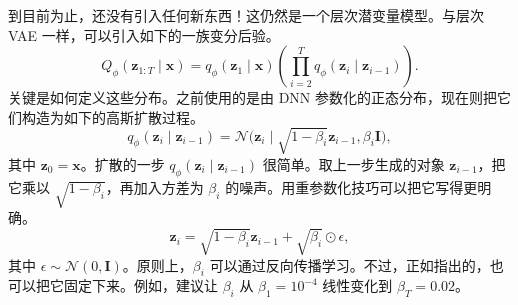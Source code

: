 到目前为止，还没有引入任何新东西！这仍然是一个层次潜变量模型。与层次 VAE 一样，可以引入如下的一族变分后验。
\begin{equation}
Q_\phi(\mathbf{z}_{1:T}\mid\mathbf{x})=q_\phi(\mathbf{z}_1\mid\mathbf{x})
 \left(\prod_{i=2}^T q_\phi(\mathbf{z}_i\mid\mathbf{z}_{i-1})\right).
\tag{5.88}\label{eq:05-88}
\end{equation}
关键是如何定义这些分布。之前使用的是由 DNN 参数化的正态分布，现在则把它们构造为如下的高斯扩散过程。
\begin{equation}
q_\phi(\mathbf{z}_i\mid\mathbf{z}_{i-1})
 =\mathcal{N}\bigl(\mathbf{z}_i\mid\sqrt{1-\beta_i}\mathbf{z}_{i-1},\beta_i\mathbf{I}\bigr),
\tag{5.89}\label{eq:05-89}
\end{equation}
其中 $\mathbf{z}_0=\mathbf{x}$。扩散的一步 $q_\phi(\mathbf{z}_i\mid\mathbf{z}_{i-1})$ 很简单。取上一步生成的对象 $\mathbf{z}_{i-1}$，把它乘以 $\sqrt{1-\beta_i}$，再加入方差为 $\beta_i$ 的噪声。用重参数化技巧可以把它写得更明确。
\begin{equation}
\mathbf{z}_i=\sqrt{1-\beta_i}\mathbf{z}_{i-1}+\sqrt{\beta_i}\odot\epsilon,
\tag{5.90}\label{eq:05-90}
\end{equation}
其中 $\epsilon\sim\mathcal{N}(0,\mathbf{I})$。原则上，$\beta_i$ 可以通过反向传播学习。不过，正如指出的，也可以把它固定下来。例如，建议让 $\beta_i$ 从 $\beta_1=10^{-4}$ 线性变化到 $\beta_T=0.02$。

